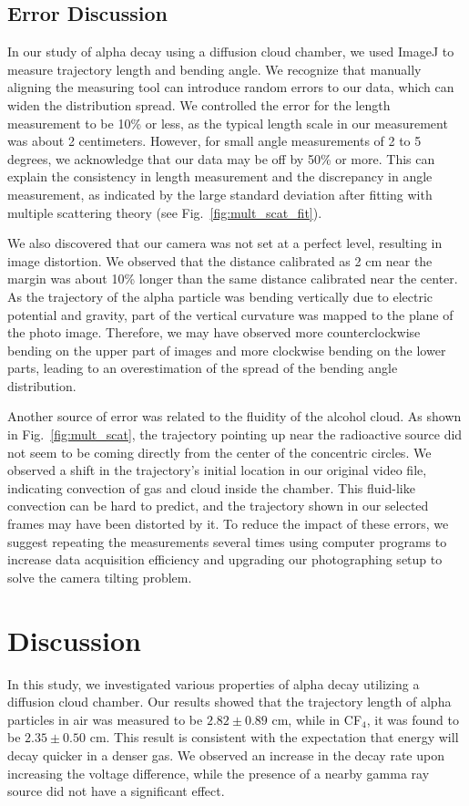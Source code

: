 \documentclass[letterpaper,12pt]{article}
\begin{document}
\subsection{Error Discussion}
In our study of alpha decay using a diffusion cloud chamber, we used ImageJ to measure trajectory length and bending angle. We recognize that manually aligning the measuring tool can introduce random errors to our data, which can widen the distribution spread. We controlled the error for the length measurement to be 10\% or less, as the typical length scale in our measurement was about 2 centimeters. However, for small angle measurements of 2 to 5 degrees, we acknowledge that our data may be off by 50\% or more. This can explain the consistency in length measurement and the discrepancy in angle measurement, as indicated by the large standard deviation after fitting with multiple scattering theory (see Fig.~\ref{fig:mult_scat_fit}).

We also discovered that our camera was not set at a perfect level, resulting in image distortion. We observed that the distance calibrated as 2 cm near the margin was about 10\% longer than the same distance calibrated near the center. As the trajectory of the alpha particle was bending vertically due to electric potential and gravity, part of the vertical curvature was mapped to the plane of the photo image. Therefore, we may have observed more counterclockwise bending on the upper part of images and more clockwise bending on the lower parts, leading to an overestimation of the spread of the bending angle distribution.

Another source of error was related to the fluidity of the alcohol cloud. As shown in Fig.~\ref{fig:mult_scat}, the trajectory pointing up near the radioactive source did not seem to be coming directly from the center of the concentric circles. We observed a shift in the trajectory's initial location in our original video file, indicating convection of gas and cloud inside the chamber. This fluid-like convection can be hard to predict, and the trajectory shown in our selected frames may have been distorted by it. To reduce the impact of these errors, we suggest repeating the measurements several times using computer programs to increase data acquisition efficiency and upgrading our photographing setup to solve the camera tilting problem.

\section{Discussion}
In this study, we investigated various properties of alpha decay utilizing a diffusion cloud chamber. Our results showed that the trajectory length of alpha particles in air was measured to be $2.82\pm 0.89$ cm, while in CF$_4$, it was found to be $2.35 \pm 0.50$ cm. This result is consistent with the expectation that energy will decay quicker in a denser gas. We observed an increase in the decay rate upon increasing the voltage difference, while the presence of a nearby gamma ray source did not have a significant effect.
\end{document}
